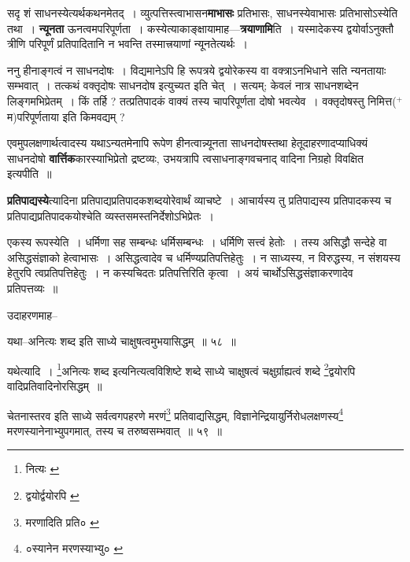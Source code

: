 \documentclass[article,12pt,a4paper]{memoir}
\newcommand{\add}[1]{($^{+}$#1)}
\begin{document}
	  \pstart सदृ\leavevmode{} शं साधनस्येत्यर्थकथनमेतद् । व्युत्पत्तिस्त्वाभासन\textbf{माभासः} प्रतिभासः, साधनस्येवाभासः प्रतिभासोऽस्येति तथा । \textbf{न्यूनता} ऊनत्वमपरिपूर्णता । कस्येत्याकाङ्क्षायामाह—\textbf{त्रयाणामि}ति । यस्मादेकस्य द्वयोर्वाऽनुक्तौ त्रीणि परिपूर्णं प्रतिपादितानि न भवन्ति तस्मात्त्रयाणां न्यूनतेत्यर्थः ।
	\pend
      

	  \pstart ननु हीनाङ्गत्वं न साधनदोषः । विद्यमानेऽपि हि रूपत्रये द्वयोरेकस्य वा वक्त्राऽनभिधाने सति न्यनतायाः सम्भवात् । तत्कथं वक्तृदोषः साधनदोष इत्युच्यत इति चेत् । सत्यम्; केवलं नात्र साधनशब्देन लिङ्गमभिप्रेतम् । किं तर्हि ? तत्प्रतिपादकं वाक्यं तस्य चापरिपूर्णता दोषो भवत्येव । वक्तृदोषस्तु निमित्त\add{म}परिपूर्णताया इति किमवद्यम् ?
	\pend
      

	  \pstart एवमुपलक्षणार्थत्वादस्य यथाऽन्यतमेनापि रूपेण हीनत्वान्न्यूनता साधनदोषस्तथा हेतूदाहरणादप्याधिक्यं साधनदोषो \textbf{वार्त्तिक}कारस्याभिप्रेतो द्रष्टव्यः, उभयत्रापि त्वसाधनाङ्गवचनाद् वादिना निग्रहो विवक्षित इत्यपीति ॥
	\pend
      

	  \pstart \textbf{प्रतिपाद्यस्ये}त्यादिना प्रतिपाद्यप्रतिपादकशब्दयोरेवार्थं व्याचष्टे । आचार्यस्य तु प्रतिपाद्यस्य प्रतिपादकस्य च प्रतिपाद्यप्रतिपादकयोश्चेति व्यस्तसमस्तनिर्देशोऽभिप्रेतः ।
	\pend
	  \bigskip
	  \begingroup
	

	  \pstart एकस्य रूपस्येति । धर्मिणा सह सम्बन्धः धर्मिसम्बन्धः । धर्मिणि सत्त्वं हेतोः । तस्य असिद्धौ सन्देहे वा असिद्धसंज्ञाको हेत्वाभासः । असिद्धत्वादेव च धर्मिण्यप्रतिपत्तिहेतुः । न साध्यस्य, न विरुद्धस्य, न संशयस्य हेतुरपि त्वप्रतिपत्तिहेतुः । न कस्यचिदतः प्रतिपत्तिरिति कृत्वा । अयं चार्थोऽसिद्धसंज्ञाकरणादेव प्रतिपत्तव्यः ॥
	\pend
       

	  \pstart उदाहरणमाह--
	\pend
       
	  \bigskip
	  \begingroup
	

	  \pstart यथा--अनित्यः शब्द इति साध्ये चाक्षुषत्वमुभयासिद्धम् ॥ ५८ ॥
	\pend
      
	  \endgroup
	 

	  \pstart यथेत्यादि । \footnote{नित्यः \cite{dp-msB}}\-अनित्यः शब्द इत्यनित्यत्वविशिष्टे शब्दे साध्ये चाक्षुषत्वं चक्षुर्ग्राह्यत्वं शब्दे \footnote{द्वयोर्द्वयोरपि \cite{dp-msB}}\-द्वयोरपि वादिप्रतिवादिनोरसिद्धम् ॥
	\pend
       
	  \bigskip
	  \begingroup
	

	  \pstart चेतनास्तरव इति साध्ये सर्वत्वगपहरणे मरणं\footnote{मरणादिति प्रति० \cite{dp-msC}} प्रतिवाद्यसिद्धम्, विज्ञानेन्द्रियायुर्निरोधलक्षणस्य\footnote{०स्यानेन मरणस्याभ्यु० \cite{dp-msC}} मरणस्यानेनाभ्युपगमात्, तस्य च तरुष्वसम्भवात् ॥ ५९ ॥
	\pend
      
\end{document}
